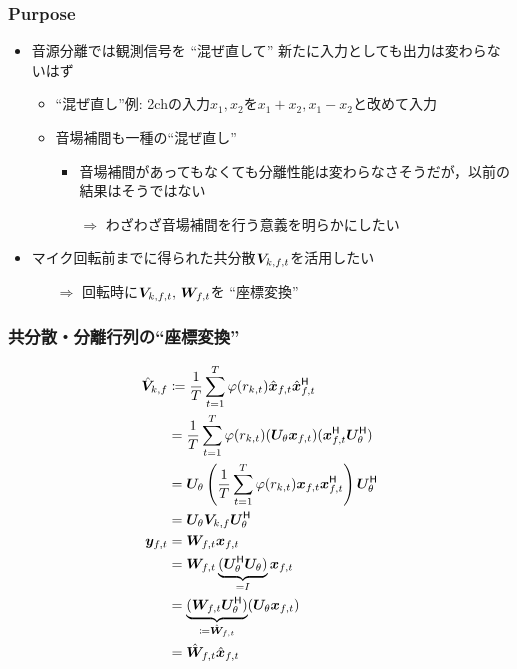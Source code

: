 \documentclass[twocolumn,9pt,dvipdfmx]{article}
\begin{document}
\subsubsection{Purpose}
\begin{itemize}
  \item 音源分離では観測信号を ``混ぜ直して'' 新たに入力としても出力は変わらないはず
    \begin{itemize}
      \item ``混ぜ直し''例: 2chの入力$x_1, x_2$を$x_1+x_2, x_1-x_2$と改めて入力
      \item 音場補間も一種の``混ぜ直し''
        \begin{itemize}
          \item 音場補間があってもなくても分離性能は変わらなさそうだが，以前の結果はそうではない
          \item[$\Rightarrow$] わざわざ音場補間を行う意義を明らかにしたい
        \end{itemize}
    \end{itemize}
  \item マイク回転前までに得られた共分散$\cov _{\src,\ft}$を活用したい
    \begin{itemize}
      \item[$\Rightarrow$] 回転時に$\cov _{\src,\ft},\, \Demix _{\ft}$を ``座標変換''
    \end{itemize}
\end{itemize}

\subsubsection{共分散・分離行列の``座標変換''}
\begin{align}
  \rot{\cov} _{\src,\freq} &\coloneqq \frac{1}{\Tframe} \sum _{\tframe = 1} ^{\Tframe} \weight (\var _{\src,\tframe}) \rotObs _{\ft} \rotObs _{\ft} ^{\hermite} \\
                           &= \frac{1}{\Tframe} \sum _{\tframe = 1} ^{\Tframe} \weight (\var _{\src,\tframe}) (\rotMat _{\rotDeg} \Obs _{\ft}) (\Obs _{\ft} ^{\hermite} \rotMat _{\rotDeg} ^{\hermite}) \\
                           &= \rotMat _{\rotDeg} \left(\frac{1}{\Tframe} \sum _{\tframe = 1} ^{\Tframe} \weight (\var _{\src,\tframe}) \Obs _{\ft} \Obs _{\ft} ^{\hermite}\right) \rotMat _{\rotDeg} ^{\hermite} \\
                           &= \rotMat _{\rotDeg} \cov _{\src,\freq} \rotMat _{\rotDeg} ^{\hermite}
  \\
  \Est _{\ft} &= \Demix _{\ft} \Obs _{\ft} \\
              &= \Demix _{\ft} \underbrace{(\rotMat _{\rotDeg} ^{\hermite} \rotMat _{\rotDeg})}_{=I} \Obs _{\ft} \\
              &= \underbrace{(\Demix _{\ft} \rotMat _{\rotDeg} ^{\hermite})}_{\coloneqq \rotDemix _{\ft}} (\rotMat _{\rotDeg} \Obs _{\ft}) \\
              &= \rotDemix _{\ft} \rotObs _{\ft}
\end{align}
\end{document}
